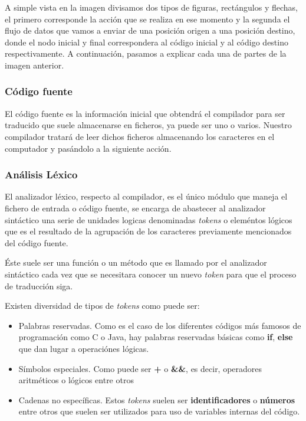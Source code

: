 \documentclass{article}
\begin{document}
    A simple vista en la imagen divisamos dos tipos de figuras, rectángulos y flechas, el primero corresponde la acción
    que se realiza en ese momento y la segunda el flujo de datos que vamos a enviar de una posición origen a una posición
    destino, donde el nodo inicial y final correspondera al código inicial y al código destino respectivamente. A continuación,
    pasamos a explicar cada una de partes de la imagen anterior.

    \subsubsection*{Código fuente}
    El código fuente es la información inicial que obtendrá el compilador para ser traducido que suele almacenarse en
    ficheros, ya puede ser uno o varios. Nuestro compilador tratará de leer dichos ficheros almacenando los caracteres en
    el computador y pasándolo a la siguiente acción.

    \subsubsection*{Análisis Léxico}
    El analizador léxico, respecto al compilador, es el único módulo que maneja el fichero de entrada o código fuente,
    se encarga de abastecer al analizador sintáctico una serie de unidades logicas denominadas \textit{tokens}
    o eleméntos lógicos que es el resultado de la agrupación de los caracteres previamente mencionados del código fuente.

    Éste suele ser una función o un método que es llamado por el analizador sintáctico cada vez que se necesitara conocer
    un nuevo \textit{token} para que el proceso de traducción siga.

    Existen diversidad de tipos de \textit{tokens} como puede ser:
    \begin{itemize}
        \item Palabras reservadas.
        Como es el caso de los diferentes códigos más famosos de programación como C o Java, hay palabras reservadas básicas
        como \textbf{if}, \textbf{else} que dan lugar a operaciónes lógicas.
        \item Símbolos especiales. Como puede ser \textbf{+} o \textbf{\&\&}, es decir, operadores aritméticos o lógicos entre
        otros
        \item Cadenas no específicas. Estos \textit{tokens} suelen ser \textbf{identificadores} o \textbf{números} entre otros que
        suelen ser utilizados para uso de variables internas del código.
    \end{itemize}
\end{document}
